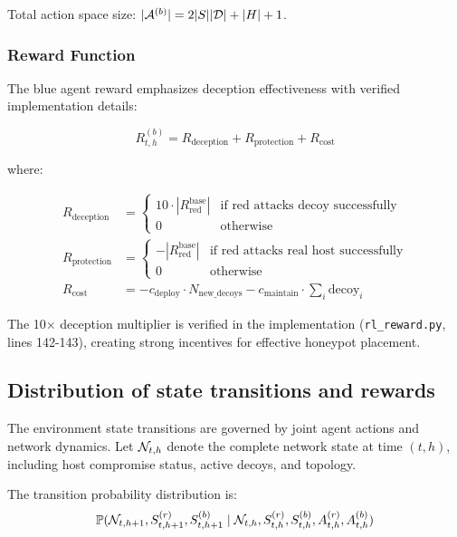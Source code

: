 \documentclass[11pt]{article}
\theoremstyle{definition}
\theoremstyle{plain}
\begin{document}
Total action space size: $|\mathcal{A}^{(b)}| = 2|S||\mathcal{D}| + |H| + 1$.

\subsubsection{Reward Function}
The blue agent reward emphasizes deception effectiveness with verified implementation details:

\begin{equation}
R_{t,h}^{(b)} = R_{\text{deception}} + R_{\text{protection}} + R_{\text{cost}}
\end{equation}

where:

\begin{align}
R_{\text{deception}} &= \begin{cases}
10 \cdot |R_{\text{red}}^{\text{base}}| & \text{if red attacks decoy successfully} \\
0 & \text{otherwise}
\end{cases} \\
R_{\text{protection}} &= \begin{cases}
-|R_{\text{red}}^{\text{base}}| & \text{if red attacks real host successfully} \\
0 & \text{otherwise}
\end{cases} \\
R_{\text{cost}} &= -c_{\text{deploy}} \cdot N_{\text{new\_decoys}} - c_{\text{maintain}} \cdot \sum_{i} \text{decoy}_i
\end{align}

The 10× deception multiplier is verified in the implementation (\texttt{rl\_reward.py}, lines 142-143), creating strong incentives for effective honeypot placement.

\subsection{Distribution of state transitions and rewards}

The environment state transitions are governed by joint agent actions and network dynamics. Let $\mathcal{N}_{t,h}$ denote the complete network state at time $(t,h)$, including host compromise status, active decoys, and topology.

The transition probability distribution is:
\begin{equation}
\mathbb{P}(\mathcal{N}_{t,h+1}, S_{t,h+1}^{(r)}, S_{t,h+1}^{(b)} \mid \mathcal{N}_{t,h}, S_{t,h}^{(r)}, S_{t,h}^{(b)}, A_{t,h}^{(r)}, A_{t,h}^{(b)})
\end{equation}
\end{document}
